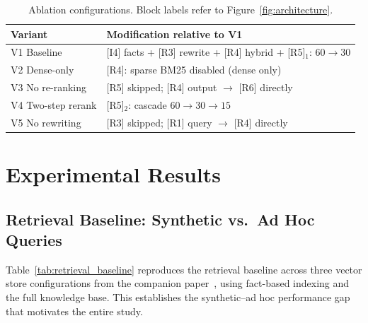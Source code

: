 \documentclass[sigconf,natbib=true]{acmart}
\begin{document}
\begin{table}[h]
\centering
\caption{Ablation configurations. Block labels refer to Figure~\ref{fig:architecture}.}
\label{tab:variants}
\small
\setlength{\tabcolsep}{4pt}
\begin{tabular}{lp{5.2cm}}
\toprule
\textbf{Variant} & \textbf{Modification relative to V1} \\
\midrule
V1 Baseline & [I4] facts + [R3] rewrite + [R4] hybrid + [R5]$_1$: $60\!\to\!30$ \\
V2 Dense-only & [R4]: sparse BM25 disabled (dense only) \\
V3 No re-ranking & [R5] skipped; [R4] output $\to$ [R6] directly \\
V4 Two-step rerank & [R5]$_2$: cascade $60\!\to\!30\!\to\!15$ \\
V5 No rewriting & [R3] skipped; [R1] query $\to$ [R4] directly \\
\bottomrule
\end{tabular}
\end{table}

\section{Experimental Results}
\label{sec:results}

\subsection{Retrieval Baseline: Synthetic vs.\ Ad Hoc Queries}

Table~\ref{tab:retrieval_baseline} reproduces the retrieval baseline across three vector store configurations from the companion paper~\cite{[COMPANION_PAPER]}, using fact-based indexing and the full knowledge base.
This establishes the synthetic--ad hoc performance gap that motivates the entire study.
\end{document}
